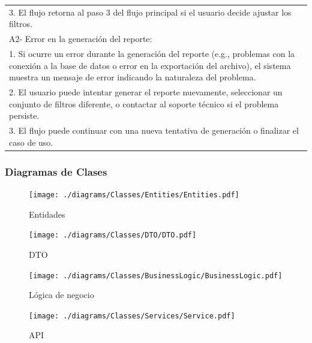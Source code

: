 \documentclass[stu, 12pt, letterpaper, donotrepeattitle, floatsintext, natbib]{apa7}
\begin{document}
\begin{longtable}{@{} p{16.5cm} @{}}
    \hspace{1cm}3. El flujo retorna al paso 3 del flujo principal si el usuario decide ajustar los filtros.                                                                                                                                                                      \\
    A2- Error en la generaci\'on del reporte:                                                                                                                                                                                                                                    \\
    \hspace{1cm}1. Si ocurre un error durante la generaci\'on del reporte (e.g., problemas con la conexi\'on a la base de datos o error en la exportaci\'on del archivo), el sistema muestra un mensaje de error indicando la naturaleza del problema.                           \\
    \hspace{1cm}2. El usuario puede intentar generar el reporte nuevamente, seleccionar un conjunto de filtros diferente, o contactar al soporte t\'ecnico si el problema persiste.                                                                                              \\
    \hspace{1cm}3. El flujo puede continuar con una nueva tentativa de generaci\'on o finalizar el caso de uso.                                                                                                                                                                  \\ \bottomrule
\end{longtable}
\newpage
\subsubsection{Diagramas de Clases}
\begin{figure}[H]
    \centering
    \caption{Entidades}
    \texttt{[image: ./diagrams/Classes/Entities/Entities.pdf]}
\end{figure}
\begin{figure}[H]
    \centering
    \caption{DTO}
    \texttt{[image: ./diagrams/Classes/DTO/DTO.pdf]}
\end{figure}
\begin{figure}[H]
    \centering
    \caption{L\'ogica de negocio}
    \texttt{[image: ./diagrams/Classes/BusinessLogic/BusinessLogic.pdf]}
\end{figure}
\begin{figure}[H]
    \centering
    \caption{API}
    \texttt{[image: ./diagrams/Classes/Services/Service.pdf]}
\end{figure}
\end{document}
